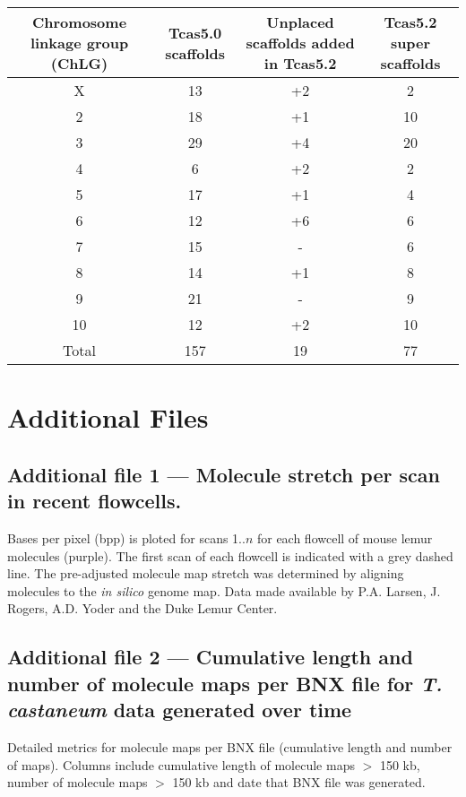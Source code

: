 \documentclass{bmcart}
\begin{document}
\begin{backmatter}
\begin{table}[h!]
	\begin{tabular}{cccc}
		\hline
		Chromosome linkage group (ChLG) & Tcas5.0 scaffolds & Unplaced scaffolds added in Tcas5.2 & Tcas5.2 super scaffolds \\ \hline
		X & 13 & +2 & 2\\
		2 & 18 & +1 & 10\\
		3 & 29 & +4 & 20\\
		4 & 6 & +2 & 2\\
		5 & 17 & +1 & 4\\
		6 & 12 & +6 & 6\\
		7 & 15 & - & 6\\
		8 & 14 & +1 & 8\\
		9 & 21 & - & 9\\
		10 & 12 & +2 & 10\\ \hline
		Total & 157 & 19 & 77\\ \hline
	\end{tabular}
\end{table}




\section*{Additional Files}

\subsection*{Additional file 1 --- Molecule stretch per scan in recent flowcells.} Bases per pixel (bpp) is ploted for scans 1..$n$ for each flowcell of mouse lemur molecules (purple). The first scan of each flowcell is indicated with a grey dashed line. The pre-adjusted molecule map stretch was determined by aligning molecules to the \textit{in silico} genome map. Data made available by P.A. Larsen, J. Rogers, A.D. Yoder and the Duke Lemur Center.

\subsection*{Additional file 2 --- Cumulative length and number of molecule maps per BNX file for \textit{T. castaneum} data generated over time}
    Detailed metrics for molecule maps per BNX file (cumulative length and number of maps). Columns include cumulative length of molecule maps  $>$ 150 kb, number of molecule maps $>$ 150 kb and date that BNX file was generated.


\end{backmatter}
\end{document}
